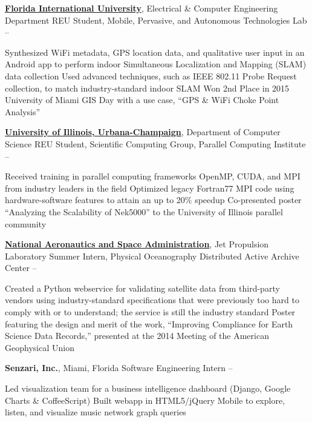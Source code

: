 \documentclass[letterpaper,MMMyyyy,nonstopmode]{simpleresumecv}
\begin{document}
\begin{Body}
\Entry
\href{http://www.fiu.edu/}{\textbf{Florida International University}}, Electrical \& Computer Engineering Department
\Gap
\BulletItem REU Student, Mobile, Pervasive, and Autonomous Technologies Lab
\hfill {} -- 
\begin{Detail}
\SubBulletItem Synthesized WiFi metadata, GPS location data, and qualitative user input in an Android app to perform indoor Simultaneous Localization and Mapping (SLAM) data collection
\SubBulletItem Used advanced techniques, such as IEEE 802.11 Probe Request collection, to match industry-standard indoor SLAM
\SubBulletItem Won 2nd Place in 2015 University of Miami GIS Day with a use case, ``GPS \& WiFi Choke Point Analysis''
\end{Detail}

\Entry
\href{http://illinois.edu/}{\textbf{University of Illinois, Urbana-Champaign}}, Department of Computer Science
\Gap
\BulletItem REU Student, Scientific Computing Group, Parallel Computing Institute
\hfill {} -- 
\begin{Detail}
\SubBulletItem Received training in parallel computing frameworks OpenMP, CUDA, and MPI from industry leaders in the field
\SubBulletItem Optimized legacy Fortran77 MPI code using hardware-software features to attain an up to 20\% speedup
\SubBulletItem Co-presented poster ``Analyzing the Scalability of Nek5000'' to the University of Illinois parallel community
\end{Detail}

\Entry
\href{http://www.jpl.nasa.gov/}{\textbf{National Aeronautics and Space Administration}}, Jet Propulsion Laboratory
\Gap
\BulletItem Summer Intern, Physical Oceanography Distributed Active Archive Center
\hfill
{} -- 
\begin{Detail}
\SubBulletItem Created a Python webservice for validating satellite data from third-party vendors using industry-standard specifications that were previously too hard to comply with or to understand; the service is still the industry standard
\SubBulletItem Poster featuring the design and merit of the work, ``Improving Compliance for Earth Science Data Records,'' presented at the 2014 Meeting of the American Geophysical Union
\end{Detail}

\Entry
\textbf{Senzari, Inc.}, Miami, Florida
\Gap
\BulletItem
Software Engineering Intern
\hfill
{} -- 
\begin{Detail}
\SubBulletItem Led visualization team for a business intelligence dashboard (Django, Google Charts \& CoffeeScript)
\SubBulletItem Built webapp in HTML5/jQuery Mobile to explore, listen, and visualize music network graph queries
\end{Detail}


\end{Body}
\end{document}
